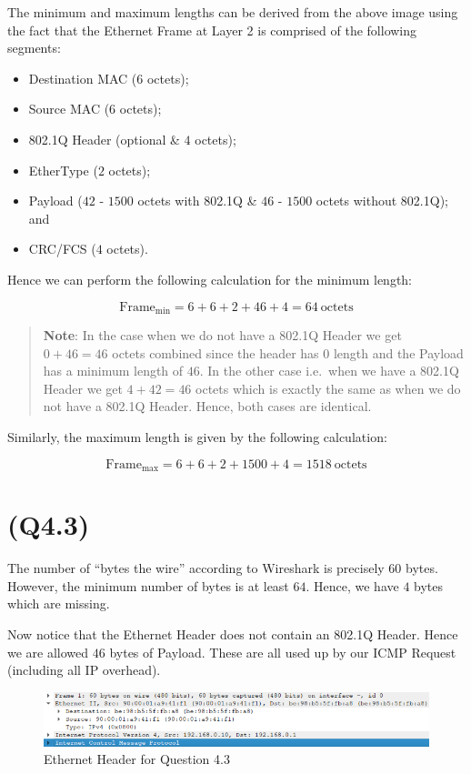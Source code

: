 The minimum and maximum lengths can be derived from the above image
using the fact that the Ethernet Frame at Layer 2 is comprised of the
following segments:

\begin{itemize}
\tightlist
\item
  Destination MAC (\(6\) octets);
\item
  Source MAC (\(6\) octets);
\item
  802.1Q Header (optional \& \(4\) octets);
\item
  EtherType (\(2\) octets);
\item
  Payload (\(42\) - \(1500\) octets with 802.1Q \& \(46\) - \(1500\)
  octets without 802.1Q); and
\item
  CRC/FCS (\(4\) octets).
\end{itemize}

Hence we can perform the following calculation for the minimum length:

\[
{\text{Frame}}_{\text{min}} = 6 + 6 + 2 + 46 + 4 = 64\ \text{octets}
\]

\begin{quote}
\textbf{Note}: In the case when we do not have a 802.1Q Header we get
\(0 + 46 = 46\) octets combined since the header has \(0\) length and
the Payload has a minimum length of \(46\). In the other case i.e.~when
we have a 802.1Q Header we get \(4 + 42 = 46\) octets which is exactly
the same as when we do not have a 802.1Q Header. Hence, both cases are
identical.
\end{quote}

Similarly, the maximum length is given by the following calculation:

\[
{\text{Frame}}_{\text{max}} = 6 + 6 + 2 + 1500 + 4 = 1518\ \text{octets}
\]

\hypertarget{q4.3}{%
\section{(Q4.3)}\label{q4.3}}

The number of ``bytes the wire'' according to Wireshark is precisely
\(60\) bytes. However, the minimum number of bytes is at least \(64\).
Hence, we have \(4\) bytes which are missing.

Now notice that the Ethernet Header does not contain an 802.1Q Header.
Hence we are allowed \(46\) bytes of Payload. These are all used up by
our ICMP Request (including all IP overhead).

\begin{figure}
\centering
\includegraphics{data/q4.3-ethernet-header.png}
\caption{Ethernet Header for Question 4.3}
\end{figure}

